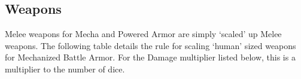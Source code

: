 \documentclass[twoside]{book}
\begin{document}
\begin{multicols}{2}
\hspace{-2ex}
\vspace{1ex}


    


\hspace{-2ex}
\vspace{1ex}


    
\end{multicols}
  
    

\subsection{Weapons}
    
    {  
     Melee weapons for Mecha and Powered Armor are
               simply `scaled' up Melee weapons. The
               following table details the rule for scaling
               `human' sized weapons for Mechanized Battle
               Armor. For the Damage multiplier listed below, this is a
               multiplier to the number of dice. 
    }
  
\end{document}

